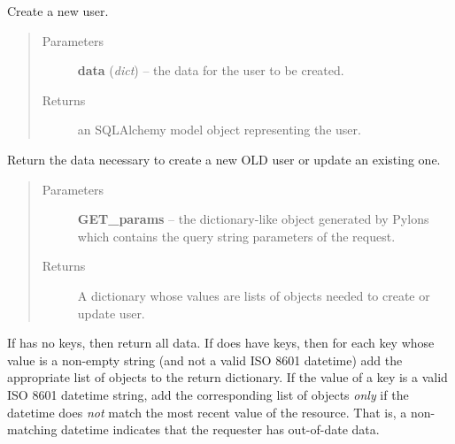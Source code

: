 \documentclass[letterpaper,10pt,english]{sphinxmanual}
\begin{document}

\begin{fulllineitems}
\label{api:onlinelinguisticdatabase.controllers.users.createNewUser}
Create a new user.
\begin{quote}\begin{description}
\item[{Parameters}] \leavevmode
\textbf{data} (\emph{dict}) -- the data for the user to be created.

\item[{Returns}] \leavevmode
an SQLAlchemy model object representing the user.

\end{description}\end{quote}

\end{fulllineitems}


\begin{fulllineitems}
\label{api:onlinelinguisticdatabase.controllers.users.getNewUserData}
Return the data necessary to create a new OLD user or update an existing one.
\begin{quote}\begin{description}
\item[{Parameters}] \leavevmode
\textbf{GET\_params} -- the  dictionary-like object generated by
Pylons which contains the query string parameters of the request.

\item[{Returns}] \leavevmode
A dictionary whose values are lists of objects needed to create or
update user.

\end{description}\end{quote}

If  has no keys, then return all data.  If  does
have keys, then for each key whose value is a non-empty string (and not a
valid ISO 8601 datetime) add the appropriate list of objects to the return
dictionary.  If the value of a key is a valid ISO 8601 datetime string, add
the corresponding list of objects \emph{only} if the datetime does \emph{not} match
the most recent  value of the resource.  That is, a
non-matching datetime indicates that the requester has out-of-date data.

\end{fulllineitems}
\end{document}
